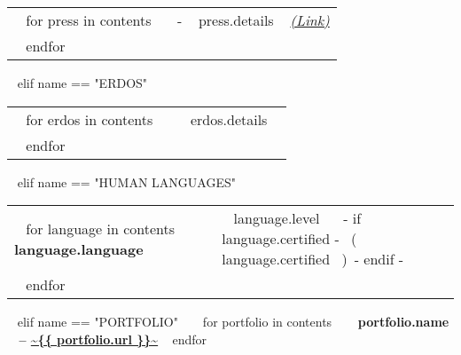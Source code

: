 \begin{minipage}{\textwidth}
\begin{tabular}{ @{} p{} p{} @{} }
  ~{ for press in contents }~
  \small \textcolor{gray}{{\emph{ }}} & 
  - {\small ~{{ press.details }}~ } \footnotesize \textcolor{gray}{\href{~{{ press.URL }}~}{\emph{(Link)}}} \\
  ~{ endfor }~
\end{tabular}


~{ elif name == "ERDOS" }~

\begin{tabular}{ @{} p{} p{} @{} }
  ~{ for erdos in contents }~
  \small \textcolor{gray}{{\emph{ }}} & {\small ~{{ erdos.details }}~} \\
  ~{ endfor }~
\end{tabular}



~{ elif name == "HUMAN LANGUAGES" }~
  \begin{tabular}{ @{} p{32mm} p{135mm} @{} }
  ~{ for language in contents }~
    \bf {~{{ language.language }}~} & {\small ~{{ language.level }}~ ~{- if language.certified -}~ \small\color{maingrey}\hspace{1mm}(~{{ language.certified }}~)~{- endif -}~} \\
  ~{ endfor }~
  \end{tabular}
  \vspace{50mm}


~{ elif name == "PORTFOLIO" }~
  ~{ for portfolio in contents }~
    {\bf ~{{ portfolio.name }}~ -- \color{maincolor}\url{~{{ portfolio.url }}~} }
    \vspace{1mm}
  ~{ endfor }~
  \vspace{5mm}



\end{minipage}
